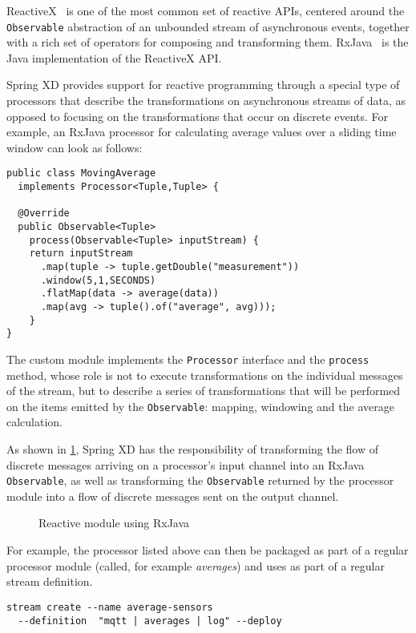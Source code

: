 ReactiveX~\cite{reactivex} is one of the most common set of reactive APIs, centered around
the \texttt{Observable} abstraction of an unbounded stream of asynchronous events,
together with a rich set of operators for composing and transforming them.
RxJava~\cite{rxjava} is the Java implementation of the ReactiveX API.

Spring XD provides support for reactive programming through a special type of
processors that describe the transformations on asynchronous streams of data, as
opposed to focusing on the transformations that occur on discrete events. For example,
an RxJava processor for calculating average values over a sliding time window can look as follows:

\begin{lstlisting}
public class MovingAverage
  implements Processor<Tuple,Tuple> {

  @Override
  public Observable<Tuple>
    process(Observable<Tuple> inputStream) {
    return inputStream
      .map(tuple -> tuple.getDouble("measurement"))
      .window(5,1,SECONDS)
      .flatMap(data -> average(data))
      .map(avg -> tuple().of("average", avg)));
    }
}
\end{lstlisting}

The custom module implements the \texttt{Processor} interface and the
\texttt{process} method, whose role is not to execute transformations
on the individual messages of the stream, but to describe a series of
transformations that will be performed on the items emitted by the
\texttt{Observable}: mapping, windowing and the average calculation.

As shown in \ref{fig:rxjava}, Spring XD has the responsibility of transforming the
flow of discrete messages arriving on a processor's input channel into an
RxJava \texttt{Observable}, as well as transforming the \texttt{Observable}
returned by the processor module into a flow of discrete messages sent on
the output channel.

\begin{figure}[ht]
\centering
{}
\caption{Reactive module using RxJava}
\label{fig:rxjava}
\end{figure}

For example, the processor listed above can then be packaged as part of a regular
 processor module (called, for example \emph{averages}) and uses as part of a
 regular stream definition.

\begin{lstlisting}
stream create --name average-sensors
  --definition  "mqtt | averages | log" --deploy
\end{lstlisting}

